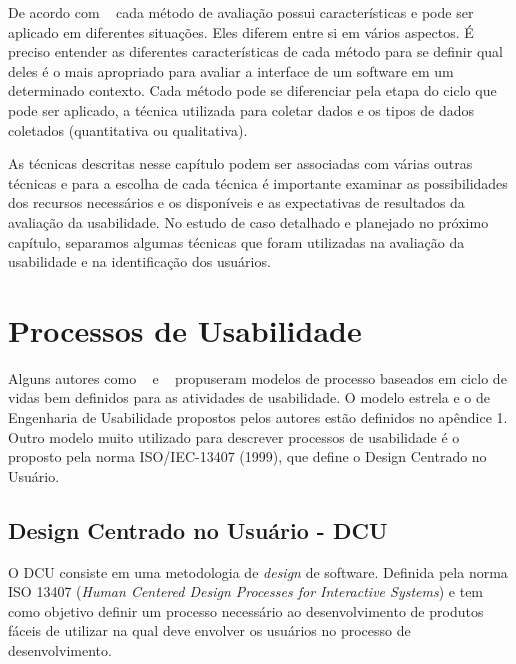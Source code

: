 De acordo com ~ cada método de avaliação possui características e pode ser aplicado em diferentes situações.
%
Eles diferem entre si em vários aspectos. É preciso entender as diferentes características de cada método para se definir qual deles é o mais apropriado para avaliar a interface de um software em um determinado contexto.
%
Cada método pode se diferenciar pela etapa do ciclo que pode ser aplicado, a técnica utilizada para coletar dados e os tipos de dados coletados (quantitativa ou qualitativa). 

As técnicas descritas nesse capítulo podem ser associadas com várias outras técnicas e para a escolha de cada técnica é importante examinar as possibilidades dos recursos necessários e os disponíveis e as expectativas de resultados da avaliação da usabilidade. 
%
No estudo de caso detalhado e planejado no próximo capítulo, separamos algumas técnicas que foram utilizadas na avaliação da usabilidade e na identificação dos usuários. 


%



\section{Processos de Usabilidade}


	Alguns autores como ~ e ~ propuseram modelos de processo baseados em ciclo de vidas bem definidos para as atividades de usabilidade. O modelo estrela e o de Engenharia de Usabilidade propostos pelos autores estão definidos no apêndice 1. 
	Outro modelo muito utilizado para descrever processos de usabilidade é o proposto pela norma ISO/IEC-13407 (1999), que define o Design Centrado no Usuário.


\subsection{Design Centrado no Usuário - DCU}

O DCU consiste em uma metodologia de \emph{design} de software. Definida pela norma ISO 13407 (\textit{Human Centered Design Processes for Interactive Systems}) e tem como objetivo definir um processo necessário ao desenvolvimento de produtos fáceis de utilizar na qual deve envolver os usuários no processo de desenvolvimento.

